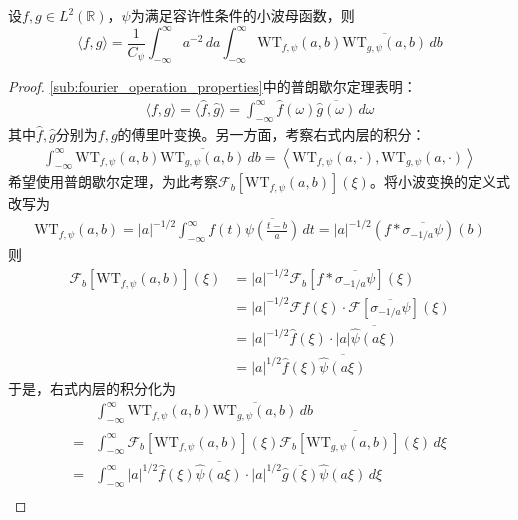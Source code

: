 \documentclass{ctexbook}
\begin{document}
\begin{theorem}[小波变换普朗歇尔公式]
    设$f,g\in L^2(\mathbb{R})$，$\psi$为满足容许性条件的小波母函数，则
    \[\langle f,g\rangle=\frac{1}{C_{\psi}}\int_{-\infty}^{\infty}a^{-2}\,da\int_{-\infty}^{\infty}\mathrm{WT} _{f,\psi}(a,b)\overline{\mathrm{WT} _{g,\psi}(a,b)}\,db\]
\end{theorem}
\begin{proof}
    \ref{sub:fourier_operation_properties}中的普朗歇尔定理表明：
    \begin{align*}
        \langle f,g\rangle=\langle \hat{f},\hat{g}\rangle=\int_{-\infty}^{\infty}\hat{f}(\omega)\overline{\hat{g}(\omega)}\,d\omega
    \end{align*}
    其中$\hat{f},\hat{g}$分别为$f,g$的傅里叶变换。另一方面，考察右式内层的积分：
    \begin{align*}
        \int_{-\infty}^{\infty}\mathrm{WT} _{f,\psi}(a,b)\overline{\mathrm{WT} _{g,\psi}(a,b)}\,db=\left\langle \mathrm{WT} _{f,\psi}(a,\cdot),\mathrm{WT} _{g,\psi}(a,\cdot)\right\rangle
    \end{align*}
    希望使用普朗歇尔定理，为此考察$\mathcal{F} _b[\mathrm{WT} _{f,\psi}(a,b)](\xi)$。将小波变换的定义式改写为
    \begin{align*}
        \mathrm{WT} _{f,\psi}(a,b)=|a|^{-1/2}\int_{-\infty}^{\infty}f(t)\overline{\psi\left(\frac{t-b}{a}\right)}\,dt=|a|^{-1/2}(f*\overline{\sigma_{-1/a}\psi})(b)
    \end{align*}
    则
    \begin{align*}
        \mathcal{F} _b[\mathrm{WT} _{f,\psi}(a,b)](\xi)&=|a|^{-1/2}\mathcal{F} _b[f*\overline{\sigma_{-1/a}\psi}](\xi)\\
        &=|a|^{-1/2}\mathcal{F} f(\xi)\cdot \mathcal{F} [\overline{\sigma_{-1/a}\psi}](\xi)\\
        &=|a|^{-1/2}\hat{f}(\xi)\cdot |a|\overline{\hat{\psi}(a\xi)}\\
        &=|a|^{1/2}\hat{f}(\xi)\overline{\hat{\psi}(a\xi)}
    \end{align*}
    于是，右式内层的积分化为
    \begin{align*}
        &\int_{-\infty}^{\infty}\mathrm{WT} _{f,\psi}(a,b)\overline{\mathrm{WT} _{g,\psi}(a,b)}\,db\\
        =&\int_{-\infty}^{\infty}\mathcal{F} _b[\mathrm{WT} _{f,\psi}(a,b)](\xi)\overline{\mathcal{F} _b[\mathrm{WT} _{g,\psi}(a,b)](\xi)}\,d\xi\\
        =&\int_{-\infty}^{\infty}|a|^{1/2}\hat{f}(\xi)\overline{\hat{\psi}(a\xi)}\cdot |a|^{1/2}\overline{\hat{g}(\xi)}\hat{\psi}(a\xi)\,d\xi\\

\end{align*}
\end{proof}
\end{document}
